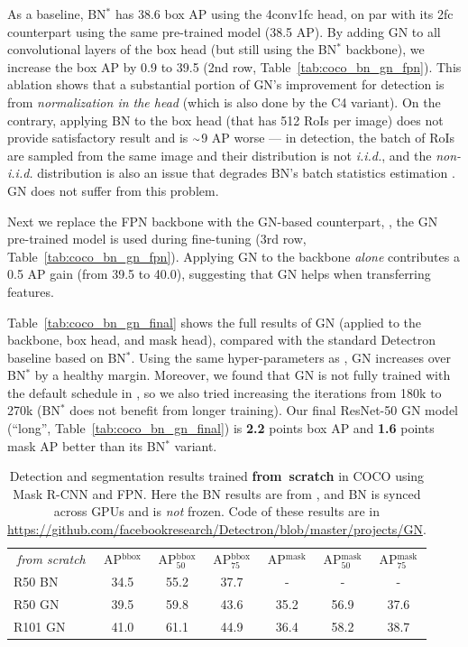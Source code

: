 \documentclass[10pt,twocolumn,letterpaper]{article}
\newcommand{\app}{\raise.17ex\hbox{$\scriptstyle\sim$}}
\newcommand{\f}{$^\text{*}$\xspace}
\begin{document}
As a baseline, BN\f has 38.6 box AP using the 4conv1fc head, on par with its 2fc counterpart using the same pre-trained model (38.5 AP). By adding GN to all convolutional layers of the box head (but still using the BN\f backbone), we increase the box AP by 0.9 to 39.5 (2nd row, Table~\ref{tab:coco_bn_gn_fpn}). This ablation shows that a substantial portion of GN's improvement for detection is from \emph{normalization in the head} (which is also done by the C4 variant). On the contrary, applying BN to the box head (that has 512 RoIs per image) does not provide satisfactory result and is $\app$9 AP worse --- in detection, the batch of RoIs are sampled from the same image and their distribution is not \emph{i.i.d.}, and the \emph{non-i.i.d.} distribution is also an issue that degrades BN's batch statistics estimation \cite{Ioffe2017}. GN does not suffer from this problem.

Next we replace the FPN backbone with the GN-based counterpart, \ie, the GN pre-trained model is used during fine-tuning (3rd row, Table~\ref{tab:coco_bn_gn_fpn}).
Applying GN to the backbone \emph{alone} contributes a 0.5 AP gain (from 39.5 to 40.0), suggesting that GN helps when transferring features.

Table~\ref{tab:coco_bn_gn_final} shows the full results of GN (applied to the backbone, box head, and mask head), compared with the standard Detectron baseline \cite{Detectron2018} based on BN\f. Using the same hyper-parameters as \cite{Detectron2018}, GN increases over BN\f by a healthy margin. Moreover, we found that GN is not fully trained with the default schedule in \cite{Detectron2018}, so we also tried increasing the iterations from 180k to 270k (BN\f does not benefit from longer training). 
Our final ResNet-50 GN model (``long'', Table~\ref{tab:coco_bn_gn_final}) is \textbf{2.2} points box AP and \textbf{1.6} points mask AP better than its BN\f variant.

\renewcommand\arraystretch{1.2}
\setlength{\tabcolsep}{2.2pt}
\begin{table}[t]
\centering
\small
\begin{tabular}{l|ccc|ccc}
\hline
\multicolumn{1}{c|}{\emph{from scratch}} & AP$^\text{bbox}$ & AP$^\text{bbox}_\text{50}$ & AP$^\text{bbox}_\text{75}$ & AP$^\text{mask}$ & AP$^\text{mask}_\text{50}$ & AP$^\text{mask}_\text{75}$ \\
\shline
R50 BN \cite{Li2018} & 34.5 & 55.2 & 37.7 & - & - & - \\
\hline
R50 GN & 39.5 & 59.8 & 43.6 & 35.2 & 56.9 & 37.6 \\
R101 GN & 41.0 & 61.1 & 44.9 & 36.4 & 58.2 & 38.7 \\
\hline
\end{tabular}
\vspace{.5em}
\caption{Detection and segmentation results trained \textbf{from~scratch} in COCO using Mask R-CNN and FPN. Here the BN results are from \cite{Li2018}, and BN is synced across GPUs \cite{Peng2018} and is \emph{not} frozen. Code of these results are in {\footnotesize \url{https://github.com/facebookresearch/Detectron/blob/master/projects/GN}}.
}\label{tab:coco_bn_gn_scratch}
\vspace{-.5em}
\end{table}
\end{document}
